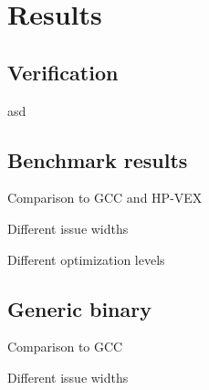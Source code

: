 \chapter{Results}
\label{chap:results}
\section{Verification}
asd

\section{Benchmark results}
Comparison to GCC and HP-VEX

Different issue widths

Different optimization levels

\section{Generic binary}
Comparison to GCC

Different issue widths
\acresetall
